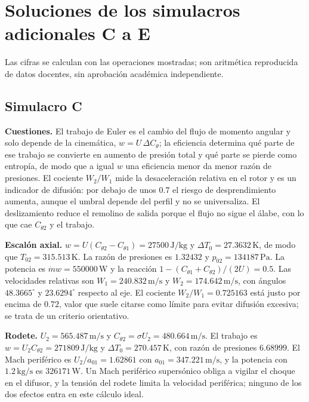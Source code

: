 \chapter{Soluciones de los simulacros adicionales C a E}
Las cifras se calculan con las operaciones mostradas; son aritmética reproducida de datos docentes, sin aprobación académica independiente.

\section{Simulacro C}
\textbf{Cuestiones.} El trabajo de Euler es el cambio del flujo de momento angular y solo depende de la cinemática, $w=U\,\Delta C_\theta$; la eficiencia determina qué parte de ese trabajo se convierte en aumento de presión total y qué parte se pierde como entropía, de modo que a igual $w$ una eficiencia menor da menor razón de presiones. El cociente $W_2/W_1$ mide la desaceleración relativa en el rotor y es un indicador de difusión: por debajo de unos $0.7$ el riesgo de desprendimiento aumenta, aunque el umbral depende del perfil y no se universaliza. El deslizamiento reduce el remolino de salida porque el flujo no sigue el álabe, con lo que cae $C_{\theta2}$ y el trabajo.

\textbf{Escalón axial.} $w=U(C_{\theta2}-C_{\theta1})=27500\,\mathrm{J/kg}$ y $\Delta T_0=27.3632\,\mathrm K$, de modo que $T_{02}=315.513\,\mathrm K$. La razón de presiones es $1.32432$ y $p_{02}=134187\,\mathrm{Pa}$. La potencia es $\dot m w=550000\,\mathrm W$ y la reacción $1-(C_{\theta1}+C_{\theta2})/(2U)=0.5$. Las velocidades relativas son $W_1=240.832\,\mathrm{m/s}$ y $W_2=174.642\,\mathrm{m/s}$, con ángulos $48.3665^\circ$ y $23.6294^\circ$ respecto al eje. El cociente $W_2/W_1=0.725163$ está justo por encima de $0.72$, valor que suele citarse como límite para evitar difusión excesiva; se trata de un criterio orientativo.

\textbf{Rodete.} $U_2=565.487\,\mathrm{m/s}$ y $C_{\theta2}=\sigma U_2=480.664\,\mathrm{m/s}$. El trabajo es $w=U_2C_{\theta2}=271809\,\mathrm{J/kg}$ y $\Delta T_0=270.457\,\mathrm K$, con razón de presiones $6.68999$. El Mach periférico es $U_2/a_{01}=1.62861$ con $a_{01}=347.221\,\mathrm{m/s}$, y la potencia con $1.2\,\mathrm{kg/s}$ es $326171\,\mathrm W$. Un Mach periférico supersónico obliga a vigilar el choque en el difusor, y la tensión del rodete limita la velocidad periférica; ninguno de los dos efectos entra en este cálculo ideal.




